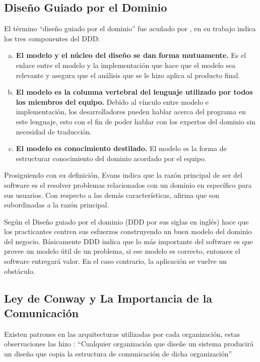 \subsection{Diseño Guiado por el Dominio}

El término ``diseño guiado por el dominio'' fue acuñado por \cite{evans2004domain}, en su trabajo
indica los tres componentes del DDD:

\begin{enumerate}[a.]
  \item \textbf{El modelo y el núcleo del diseño se dan forma mutuamente.}
    Es el enlace entre el modelo y la implementación que hace que el modelo sea relevante y asegura que el
    análisis que se le hizo aplica al producto final.
  \item \textbf{El modelo es la columna vertebral del lenguaje utilizado por todos los miembros del equipo.}
    Debido al vínculo entre modelo e implementación, los desarrolladores pueden hablar acerca del
    programa en este lenguaje, esto con el fin de poder hablar con los expertos del dominio sin
    necesidad de traducción.
  \item \textbf{El modelo es conocimiento destilado.}
    El modelo es la forma de estructurar conocimiento del dominio acordado por el equipo.
\end{enumerate}

Prosiguiendo con su definición, Evans indica que la razón principal de ser del software es el
resolver problemas relacionados con un dominio en específico para sus usuarios.
Con respecto a las demás características, afirma que son subordinadas a la razón principal.

Según \cite{percival2020architecture} el Diseño guiado por el dominio (DDD por sus siglas en inglés)
hace que los practicantes centren sus esfuerzos construyendo un buen modelo del dominio del negocio.
Básicamente DDD indica que lo más importante del software es que provee un modelo útil de un problema,
si ese modelo es correcto, entonces el software entregará valor.
En el caso contrario, la aplicación se vuelve un obstáculo.


\subsection{Ley de Conway y La Importancia de la Comunicación}

Existen patrones en las arquitecturas utilizadas por cada organización, estas observaciones
las hizo \cite{conway1968committees}: ``Cualquier organización que diseñe un sistema producirá
un diseño que copia la estructura de comunicación de dicha organización''

